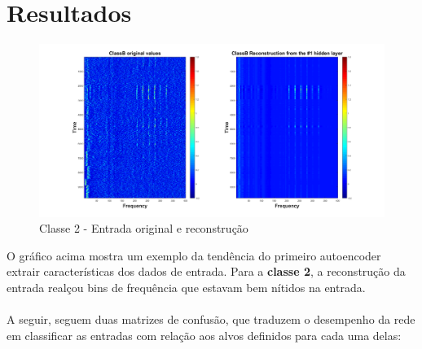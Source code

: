 \documentclass[]{report}
\begin{document}
	\vspace{8cm}
	
	\section*{Resultados}
	\begin{figure}[H]
		\hspace{-2cm}\includegraphics[width=1.3\linewidth]{picts/reconstruction_ClassB_v2_only1st.png}
		\caption{Classe 2 - Entrada original e reconstrução}
	\end{figure}
	O gráfico acima mostra um exemplo da tendência do primeiro autoencoder extrair características dos dados de entrada. Para a \textbf{classe 2}, a reconstrução da entrada realçou bins de frequência que estavam bem nítidos na entrada.\\\\
	A seguir, seguem duas matrizes de confusão, que traduzem o desempenho da rede em classificar as entradas com relação aos alvos definidos para cada uma delas:
\end{document}
